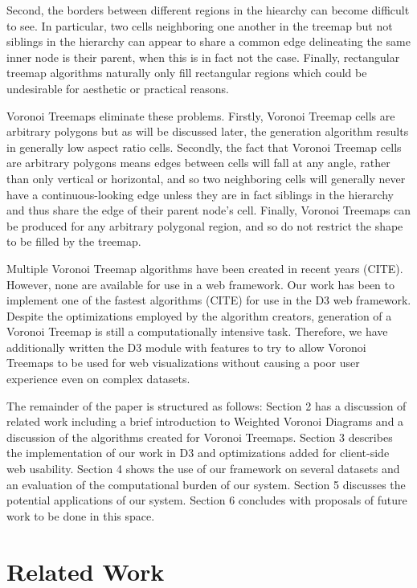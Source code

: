 \documentclass{acm_proc_article-sp}
\begin{document}
Second, the borders between different regions in the hiearchy can
become difficult to see. In particular, two cells
neighboring one another in the treemap but not siblings in the
hierarchy can appear to share a common edge delineating the same inner
node is their parent, when this is in fact not the case. 
Finally, rectangular treemap algorithms naturally only fill
rectangular regions which could be undesirable for aesthetic or
practical reasons.

Voronoi Treemaps eliminate these problems. Firstly, Voronoi Treemap
cells are arbitrary polygons but as will be discussed later, the
generation algorithm results in generally low aspect ratio
cells. Secondly, the fact that Voronoi Treemap cells are arbitrary
polygons means edges between cells will fall at any angle, rather
than only vertical or horizontal, and so two neighboring cells will
generally never have a continuous-looking edge unless they are in fact
siblings in the hierarchy and thus share the edge of their parent
node's cell. Finally, Voronoi Treemaps can be produced for any
arbitrary polygonal region, and so do not restrict the shape to be
filled by the treemap.

Multiple Voronoi Treemap algorithms have been created in recent years
(CITE). However, none are available for use in a web framework.  Our
work has been to implement one of the fastest algorithms (CITE) for
use in the D3 web framework. Despite the optimizations employed by the
algorithm creators, generation of a Voronoi Treemap is still a
computationally intensive task. Therefore, we have additionally
written the D3 module with features to try to allow Voronoi Treemaps
to be used for web visualizations without causing a poor user
experience even on complex datasets.

The remainder of the paper is structured as follows: Section 2 has a
discussion of related work including a brief introduction to Weighted Voronoi
Diagrams and a discussion of the algorithms created for Voronoi
Treemaps. Section 3 describes the implementation of our work in D3 and
optimizations added for client-side web usability. Section 4 shows the
use of our framework on several datasets and an evaluation of the
computational burden of our system. Section 5 discusses the potential
applications of our system. Section 6 concludes with proposals of
future work to be done in this space.

\section{Related Work}
\end{document}
